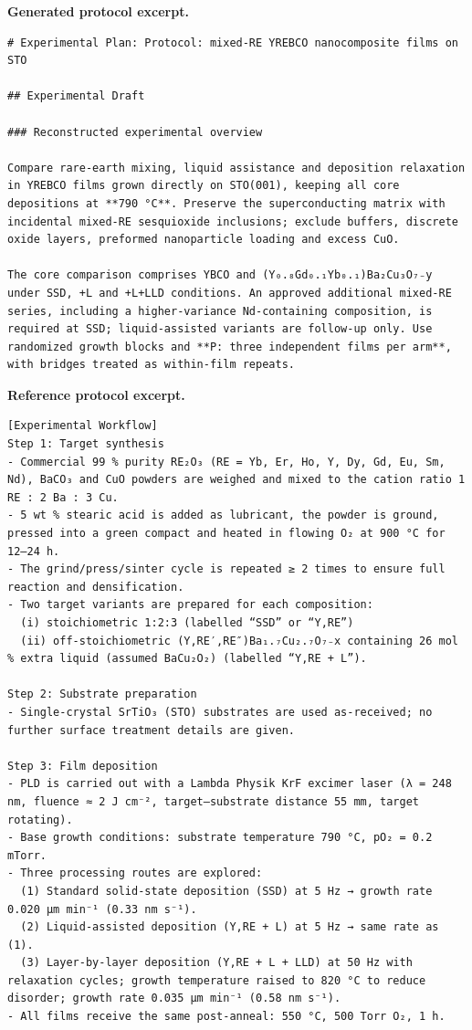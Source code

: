 \noindent\textbf{Generated protocol excerpt.}
\begin{lstlisting}[style=jsonstyle,basicstyle=\fontsize{8}{9.6}\selectfont\ttfamily,backgroundcolor=\color{white}]
# Experimental Plan: Protocol: mixed-RE YREBCO nanocomposite films on STO

## Experimental Draft

### Reconstructed experimental overview

Compare rare-earth mixing, liquid assistance and deposition relaxation in YREBCO films grown directly on STO(001), keeping all core depositions at **790 °C**. Preserve the superconducting matrix with incidental mixed-RE sesquioxide inclusions; exclude buffers, discrete oxide layers, preformed nanoparticle loading and excess CuO.

The core comparison comprises YBCO and (Y₀.₈Gd₀.₁Yb₀.₁)Ba₂Cu₃O₇₋y under SSD, +L and +L+LLD conditions. An approved additional mixed-RE series, including a higher-variance Nd-containing composition, is required at SSD; liquid-assisted variants are follow-up only. Use randomized growth blocks and **P: three independent films per arm**, with bridges treated as within-film repeats.
\end{lstlisting}

\noindent\textbf{Reference protocol excerpt.}
\begin{lstlisting}[style=jsonstyle,basicstyle=\fontsize{8}{9.6}\selectfont\ttfamily,backgroundcolor=\color{white}]
[Experimental Workflow]
Step 1: Target synthesis
- Commercial 99 % purity RE₂O₃ (RE = Yb, Er, Ho, Y, Dy, Gd, Eu, Sm, Nd), BaCO₃ and CuO powders are weighed and mixed to the cation ratio 1 RE : 2 Ba : 3 Cu.
- 5 wt % stearic acid is added as lubricant, the powder is ground, pressed into a green compact and heated in flowing O₂ at 900 °C for 12–24 h.
- The grind/press/sinter cycle is repeated ≥ 2 times to ensure full reaction and densification.
- Two target variants are prepared for each composition:
  (i) stoichiometric 1:2:3 (labelled “SSD” or “Y,RE”)
  (ii) off-stoichiometric (Y,RE′,RE″)Ba₁.₇Cu₂.₇O₇₋x containing 26 mol % extra liquid (assumed BaCu₂O₂) (labelled “Y,RE + L”).

Step 2: Substrate preparation
- Single-crystal SrTiO₃ (STO) substrates are used as-received; no further surface treatment details are given.

Step 3: Film deposition
- PLD is carried out with a Lambda Physik KrF excimer laser (λ = 248 nm, fluence ≈ 2 J cm⁻², target–substrate distance 55 mm, target rotating).
- Base growth conditions: substrate temperature 790 °C, pO₂ = 0.2 mTorr.
- Three processing routes are explored:
  (1) Standard solid-state deposition (SSD) at 5 Hz → growth rate 0.020 µm min⁻¹ (0.33 nm s⁻¹).
  (2) Liquid-assisted deposition (Y,RE + L) at 5 Hz → same rate as (1).
  (3) Layer-by-layer deposition (Y,RE + L + LLD) at 50 Hz with relaxation cycles; growth temperature raised to 820 °C to reduce disorder; growth rate 0.035 µm min⁻¹ (0.58 nm s⁻¹).
- All films receive the same post-anneal: 550 °C, 500 Torr O₂, 1 h.
\end{lstlisting}

